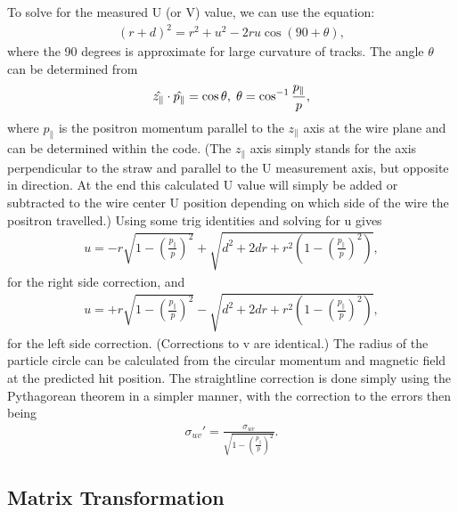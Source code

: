   To solve for the measured U (or V) value, we can use the equation:
	\begin{align}
		(r+d)^{2} = r^{2}+u^{2}-2ru\cos(90+\theta),
	\end{align}
  where the 90 degrees is approximate for large curvature of tracks. The angle $\theta$ can be determined from 
	\begin{align}
		\hat{z_{\parallel}} \cdot \hat{p_{\parallel}} = \cos{\theta}, \hspace{.1cm} \theta = \cos^{-1}{\frac{p_{\parallel}}{p}}, 
	\end{align}
  where $p_{\parallel}$ is the positron momentum parallel to the $z_{\parallel}$ axis at the wire plane and can be determined within the code. (The $z_{\parallel}$ axis simply stands for the axis perpendicular to the straw and parallel to the U measurement axis, but opposite in direction. At the end this calculated U value will simply be added or subtracted to the wire center U position depending on which side of the wire the positron travelled.) Using some trig identities and solving for u gives
	\begin{align}
		u = -r\sqrt{1-(\frac{p_{\parallel}}{p})^{2}} + \sqrt{d^{2} + 2dr + r^{2}(1-(\frac{p_{\parallel}}{p})^{2})},
	\end{align}
  for the right side correction, and 
	\begin{align}
		u = +r\sqrt{1-(\frac{p_{\parallel}}{p})^{2}} - \sqrt{d^{2} + 2dr + r^{2}(1-(\frac{p_{\parallel}}{p})^{2})},
	\end{align}
  for the left side correction. (Corrections to v are identical.) The radius of the particle circle can be calculated from the circular momentum and magnetic field at the predicted hit position. The straightline correction is done simply using the Pythagorean theorem in a simpler manner, with the correction to the errors then being
	\begin{align}
		\sigma_{uv}' = \frac{\sigma_{uv}}{\sqrt{1-(\frac{p_{\parallel}}{p})^{2}}}.
	\end{align}


\subsection{Matrix Transformation}
\label{sec:MatTransf}

